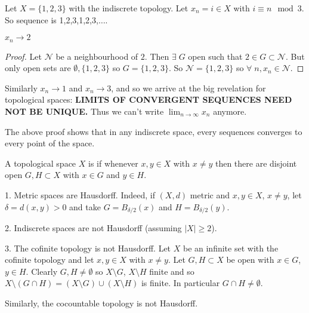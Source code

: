 \begin{example}
    Let $X = \{1,2,3\}$ with the indiscrete topology. Let $x_n =i\in X$ with $i\equiv n \mod 3$. So sequence is 1,2,3,1,2,3,$\dots$.

    \begin{claim}
        $x_n \to 2$
    \end{claim}

    \begin{proof}
    Let $\mathcal{N}$ be a neighbourhood of $2$. Then $\exists \; G$ open such that $2 \in G \subset \mathcal{N}$.
    But only open sets are $\emptyset, \{1,2,3\}$ so $G = \{1,2,3\}$. So $\mathcal{N} = \{1,2,3\}$ so $\forall \; n, x_n \in \mathcal{N}$.
    \end{proof}
    Similarly $x_n \to 1$ and $x_n \to 3$, and so we arrive at the big revelation for topological spaces: \textbf{\color{red} LIMITS OF CONVERGENT SEQUENCES NEED NOT BE UNIQUE.}
    Thus we can't write $\lim_{n \to \infty} x_n$ anymore.
\end{example}

\begin{remark}
The above proof shows that in any indiscrete space, every sequences converges to every point of the space.
\end{remark}

\begin{definition}[Hausdorff]
A topological space $X$ is  if whenever $x,y \in X$ with $x \neq y$ then there are disjoint open $G,H \subset X$ with $x \in G$ and $y \in H$.
\end{definition}

\begin{example}
1. Metric spaces are Hausdorff. Indeed, if $(X,d)$ metric and $x,y \in X$, $x \neq y$, let $\delta = d(x,y) >0$ and take $G = B_{\delta/2}(x)$ and $H=B_{\delta/2}(y)$.

2. Indiscrete spaces are not Hausdorff (assuming $|X| \geq 2$).

3. The cofinite topology is not Hausdorff.
Let $X$ be an infinite set with the cofinite topology and let $x,y\in X$ with $x\neq y$.
Let $G,H\subset X$ be open with $x\in G$, $y\in H$.
Clearly $G,H\neq \emptyset$ so $X \setminus G$, $X \setminus H$ finite and so $X \setminus (G\cap H) = (X \setminus G)\cup (X \setminus H)$ is finite.
In particular $G\cap H \neq \emptyset$.

Similarly, the cocountable topology is not Hausdorff.
\end{example}

